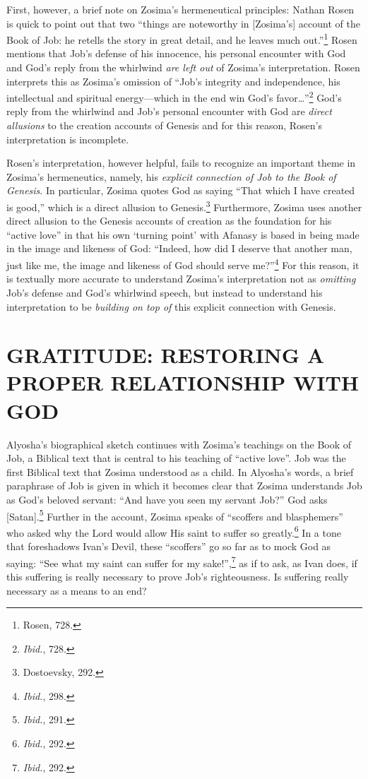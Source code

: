 First, however, a brief note on Zosima's hermeneutical principles: Nathan Rosen is quick to point out that two ``things are noteworthy in [Zosima's] account of the Book of Job: he retells the story in great detail, and he leaves much out.''\footnote{Rosen, 728.} Rosen mentions that Job's defense of his innocence, his personal encounter with God and God's reply from the whirlwind \emph{are left out} of Zosima's interpretation. Rosen interprets this as Zosima's omission of ``Job's integrity and independence, his intellectual and spiritual energy---which in the end win God's favor\ldots''\footnote{\emph{Ibid.}, 728.} God's reply from the whirlwind and Job's personal encounter with God are \emph{direct allusions} to the creation accounts of Genesis and for this reason, Rosen's interpretation is incomplete.

Rosen's interpretation, however helpful, fails to recognize an important theme in Zosima's hermeneutics, namely, his \emph{explicit connection of Job to the Book of Genesis}. In particular, Zosima quotes God as saying ``That which I have created is good,'' which is a direct allusion to Genesis.\footnote{Dostoevsky, 292.} Furthermore, Zosima uses another direct allusion to the Genesis accounts of creation as the foundation for his ``active love'' in that his own `turning point' with Afanasy is based in being made in the image and likeness of God: ``Indeed, how did I deserve that another man, just like me, the image and likeness of God should serve me?''\footnote{\emph{Ibid.}, 298.} For this reason, it is textually more accurate to understand Zosima's interpretation not as \emph{omitting} Job's defense and God's whirlwind speech, but instead to understand his interpretation to be \emph{building on top of} this explicit connection with Genesis.

\chapter{GRATITUDE: RESTORING A PROPER RELATIONSHIP WITH GOD}
Alyosha's biographical sketch continues with Zosima's teachings on the Book of Job, a Biblical text that is central to his teaching of ``active love''. Job was the first Biblical text that Zosima understood as a child. In Alyosha's words, a brief paraphrase of Job is given in which it becomes clear that Zosima understands Job as God's beloved servant: ``And have you seen my servant Job?'' God asks [Satan].\footnote{\emph{Ibid.}, 291.} Further in the account, Zosima speaks of ``scoffers and blasphemers'' who asked why the Lord would allow His saint to suffer so greatly.\footnote{\emph{Ibid.}, 292.} In a tone that foreshadows Ivan's Devil, these ``scoffers'' go so far as to mock God as saying: ``See what my saint can suffer for my sake!\thinspace'',\footnote{\emph{Ibid.}, 292.} as if to ask, as Ivan does, if this suffering is really necessary to prove Job's righteousness. Is suffering really necessary as a means to an end?

